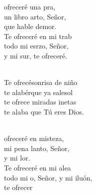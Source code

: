 \begin{cancion}%
	 ofreceré una pra, \\
	un libro arto, Señor,\\
	que hable demor. \\
	Te ofreceré en mi trab\\
	todo mi esrzo, Señor, \\
	y mi sur, te ofreceré.\\\jump\\
	\begin{chorus}%
	Te ofrecésonrisa de niño\\
	te alabérque ya salesol\\
	te ofrece miradas inetas \\
	te alaba que Tú eres Dios. \\
	\end{chorus}%
	\jump\\
	 ofreceré en misteza, \\
	mi pena lanto, Señor,\\
	y mi lor. \\
	Te ofreceré en mi alea\\
	todo mi o, Señor, y mi iluón,\\
	te ofrecer\\
\end{cancion}%
